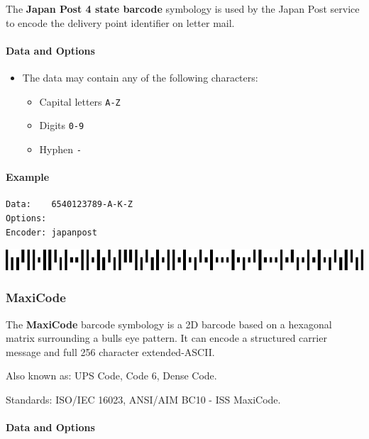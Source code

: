 The \textbf{Japan Post 4 state barcode} symbology is used by the Japan
Post service to encode the delivery point identifier on letter mail.

\hypertarget{data-and-options-45}{%
\paragraph{Data and Options}\label{data-and-options-45}}

\begin{itemize}
\tightlist
\item
  The data may contain any of the following characters:

  \begin{itemize}
  \tightlist
  \item
    Capital letters \texttt{A-Z}
  \item
    Digits \texttt{0-9}
  \item
    Hyphen \texttt{-}
  \end{itemize}
\end{itemize}

\hypertarget{example-9}{%
\paragraph{Example}\label{example-9}}

\begin{verbatim}
Data:    6540123789-A-K-Z
Options: 
Encoder: japanpost
\end{verbatim}

\includegraphics{images/japanpost-1.eps}

\hypertarget{maxicode}{%
\subsubsection{MaxiCode}\label{maxicode}}

The \textbf{MaxiCode} barcode symbology is a 2D barcode based on a
hexagonal matrix surrounding a bulls eye pattern. It can encode a
structured carrier message and full 256 character extended-ASCII.

Also known as: UPS Code, Code 6, Dense Code.

Standards: ISO/IEC 16023, ANSI/AIM BC10 - ISS MaxiCode.

\hypertarget{data-and-options-46}{%
\paragraph{Data and Options}\label{data-and-options-46}}

